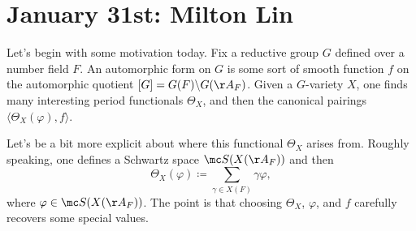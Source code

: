 \documentclass{article}
\begin{document}
\section{January 31st: Milton Lin}
Let's begin with some motivation today. Fix a reductive group $G$ defined over a number field $F$. An automorphic form on $G$ is some sort of smooth function $f$ on the automorphic quotient $[G]=G(F)\backslash G(\AA_F)$. Given a $G$-variety $X$, one finds many interesting period functionals $\Theta_X$, and then the canonical pairings $\langle\Theta_X(\varphi),f\rangle$.

Let's be a bit more explicit about where this functional $\Theta_X$ arises from. Roughly speaking, one defines a Schwartz space $\mc S(X(\AA_F))$ and then
\[\Theta_X(\varphi)\coloneqq\sum_{\gamma\in X(F)}\gamma\varphi,\]
where $\varphi\in\mc S(X(\AA_F))$. The point is that choosing $\Theta_X$, $\varphi$, and $f$ carefully recovers some special values.
\end{document}
